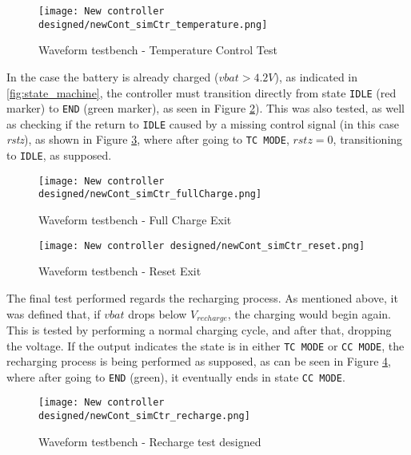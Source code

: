 \documentclass[12pt]{article}
\begin{document}
\begin{figure}[H]
    \centering
    \texttt{[image: New controller designed/newCont\_simCtr\_temperature.png]}
    \caption{Waveform testbench - Temperature Control Test}
    \label{fig:timeExit}
\end{figure}

In the case the battery is already charged ($vbat>4.2V$), as indicated in \ref{fig:state_machine}, the controller must transition directly from state \texttt{IDLE} (red marker) to \texttt{END} (green marker), as seen in Figure \ref{fig:fullCharge}). This was also tested, as well as checking if the return to \texttt{IDLE} caused by a missing control signal (in this case \textit{rstz}), as shown in Figure \ref{fig:reset}, where after going to \texttt{TC MODE}, $rstz=0$, transitioning to \texttt{IDLE}, as supposed.

\begin{figure}[H]
    \centering
    \texttt{[image: New controller designed/newCont\_simCtr\_fullCharge.png]}
    \caption{Waveform testbench - Full Charge Exit}
    \label{fig:fullCharge}
\end{figure}

\begin{figure}[H]
    \centering
    \texttt{[image: New controller designed/newCont\_simCtr\_reset.png]}
    \caption{Waveform testbench - Reset Exit}
    \label{fig:reset}
\end{figure}

The final test performed regards the recharging process. As mentioned above, it was defined that, if $vbat$ drops below $V_{recharge}$, the charging would begin again. This is tested by performing a normal charging cycle, and after that, dropping the voltage. If the output indicates the state is in either \texttt{TC MODE} or \texttt{CC MODE}, the recharging process is being performed as supposed, as can be seen in Figure \ref{fig:recharge}, where after going to \texttt{END} (green), it eventually ends in state \texttt{CC MODE}. 

\begin{figure}[H]
    \centering
    \texttt{[image: New controller designed/newCont\_simCtr\_recharge.png]}
    \caption{Waveform testbench - Recharge test designed}
    \label{fig:recharge}
\end{figure}
\end{document}
